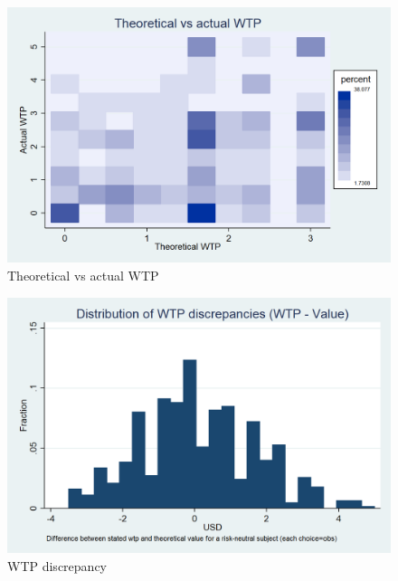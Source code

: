 \documentclass[11pt,a4paper]{article}
\begin{document}
\begin{figure}[H]
\centering
\caption{Theoretical vs actual WTP}
\includegraphics[width=\textwidth]{Graphs/WTP_value_heat.png}
\end{figure}

\begin{figure}[H]
\centering
\caption{WTP discrepancy} \label{WTP_discrepancy}

  \centering
  \includegraphics[scale=0.3]{Graphs/hist_WTP_discr1.png}

\end{figure}
\end{document}
